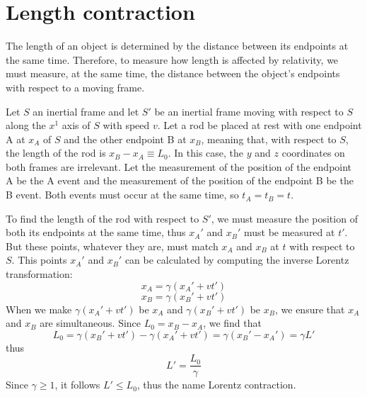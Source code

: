 \documentclass[oneside, 10pt, notitlepage]{book}
\begin{document}
\section{Length contraction}

The length of an object is determined by the distance between its endpoints at the same time. Therefore, to measure how length is affected by relativity, we must measure, at the same time, the distance between the object's endpoints with respect to a moving frame.  

Let \(S\) an inertial frame and let \(S{\prime}\) be an inertial frame moving with respect to \(S\) along the \(x^1\) axis of \(S\) with speed \(v\). Let a rod be placed at rest with one endpoint A at \(x_A\) of \(S\) and the other endpoint B at \(x_B\), meaning that, with respect to \(S\), the length of the rod is \(x_B - x_A \equiv L_0\). In this case, the \(y\) and \(z\) coordinates on both frames are irrelevant. Let the measurement of the position of the endpoint A be the A event and the measurement of the position of the endpoint B be the B event. Both events must occur at the same time, so \(t_A = t_B = t\).

To find the length of the rod with respect to \(S{\prime}\), we must measure the position of both its endpoints at the same time, thus \(x_A{\prime}\) and \(x_B{\prime}\) must be measured at \(t{\prime}\). But these points, whatever they are, must match \(x_A\) and \(x_B\) at \(t\) with respect to \(S\). This points \(x_A{\prime}\) and \(x_B{\prime}\) can be calculated by computing the inverse Lorentz transformation:
\begin{equation}x_A = \gamma(x_A{\prime} + v t{\prime})\end{equation}
\begin{equation}x_B = \gamma(x_B{\prime} + v t{\prime})\end{equation}
When we make \(\gamma(x_A{\prime} + v t{\prime})\) be \(x_A\) and \(\gamma(x_B{\prime} + v t{\prime})\) be \(x_B\), we ensure that \(x_A\) and \(x_B\) are simultaneous. Since \(L_0 = x_B - x_A\), we find that
\begin{equation}L_0 = \gamma(x_B{\prime} + v t{\prime}) - \gamma(x_A{\prime} + v t{\prime}) = \gamma(x_B{\prime} - x_A{\prime}) = \gamma L{\prime}\end{equation}
thus
\begin{equation}L{\prime} = \frac{L_0}{\gamma}\end{equation}
Since \(\gamma \geq 1\), it follows \(L{\prime}\leq L_0\), thus the name Lorentz contraction.  
\end{document}
